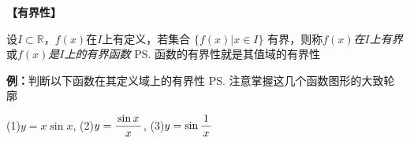 {\bf 【有界性】}			

	设$I\subset\mathbb{R}$，$f(x)$在$I$上有定义，若集合
	$\{f(x)|x\in I\}$	有界，则称{\it $f(x)$在$I$上有界}
	或{\it $f(x)$是$I$上的有界函数}
	\ps{函数的有界性就是其值域的有界性}

	{\bf 例：}判断以下函数在其定义域上的有界性
	\ps{注意掌握这几个函数图形的大致轮廓}
	
	\quad(1)\;$y=x\sin x$,\hspace{5em} (2)\;$y=\displaystyle\frac{\,{\sin x}\,}{\,{x}\,}$,
	\hspace{5em} (3)\;$y=\sin\displaystyle\frac{\,{1}\,}{\,{x}\,}$
		
	\begin{center}

\end{center}
